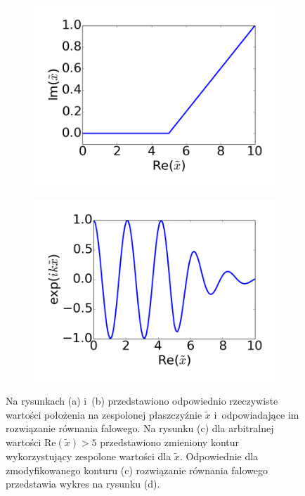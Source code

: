 \begin{figure}[htb]
	\begin{subfigure}{0.45\textwidth}
		\includegraphics[width=\textwidth]{images/pml/complex-x.png}
		\caption{}
		\label{fig:complex-contour}
	\end{subfigure}
	\begin{subfigure}{0.45\textwidth}
		\includegraphics[width=\textwidth]{images/pml/complex-x-wave.png}
		\caption{}
		\label{fig:absorbing-region}
	\end{subfigure}

	\caption{Na rysunkach (a) i~(b) przedstawiono odpowiednio rzeczywiste wartości położenia na zespolonej płaszczyźnie $\tilde{x}$ i~odpowiadające im rozwiązanie równania falowego. Na rysunku (c) dla arbitralnej  wartości $\textrm{Re}(\tilde{x})>5$ przedstawiono zmieniony kontur wykorzystujący zespolone wartości dla $\tilde{x}$. Odpowiednie dla zmodyfikowanego konturu (c)  rozwiązanie równania falowego przedstawia wykres na rysunku (d).}
	\label{fig:var-transform}
\end{figure}


